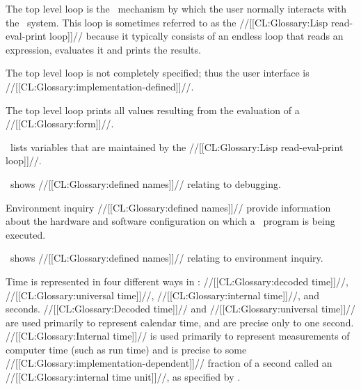 

 

The top level loop is the \clisp\ mechanism by which the user normally interacts with the \clisp\ system. This loop is sometimes referred to  as the //[[CL:Glossary:Lisp read-eval-print loop]]// because it typically consists of an endless loop that reads an expression, evaluates it and prints the results.

The top level loop is not completely specified; thus the user interface is //[[CL:Glossary:implementation-defined]]//.

The top level loop  prints all values resulting from the evaluation of a  //[[CL:Glossary:form]]//.

\Thenextfigure\ lists variables that are maintained by the //[[CL:Glossary:Lisp read-eval-print loop]]//.


\endSubsection%

  \Thenextfigure\ shows //[[CL:Glossary:defined names]]// relating to debugging.

  \endsubsection%


Environment inquiry //[[CL:Glossary:defined names]]// provide information about the hardware and software configuration on which a \clisp\ program is being executed.

\Thenextfigure\ shows //[[CL:Glossary:defined names]]// relating to environment inquiry.


\endSubsection%

 

Time is represented in four different ways in \clisp:
    //[[CL:Glossary:decoded time]]//,
    //[[CL:Glossary:universal time]]//,
    //[[CL:Glossary:internal time]]//, and seconds. //[[CL:Glossary:Decoded time]]// and //[[CL:Glossary:universal time]]// are used primarily to represent calendar time, and are precise only to one second. //[[CL:Glossary:Internal time]]// is used primarily to represent measurements of computer time (such as run time) and is precise to some //[[CL:Glossary:implementation-dependent]]// fraction of a second called an //[[CL:Glossary:internal time unit]]//, as specified by .

